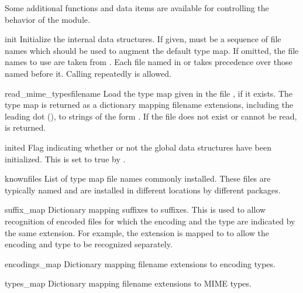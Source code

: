 Some additional functions and data items are available for controlling
the behavior of the module.


\begin{funcdesc}{init}{}
Initialize the internal data structures.  If given,  must
be a sequence of file names which should be used to augment the
default type map.  If omitted, the file names to use are taken from
.  Each file named in  or
 takes precedence over those named before it.
Calling  repeatedly is allowed.
\end{funcdesc}

\begin{funcdesc}{read_mime_types}{filename}
Load the type map given in the file , if it exists.  The 
type map is returned as a dictionary mapping filename extensions,
including the leading dot (), to strings of the form
.  If the file  does
not exist or cannot be read,  is returned.
\end{funcdesc}


\begin{datadesc}{inited}
Flag indicating whether or not the global data structures have been
initialized.  This is set to true by .
\end{datadesc}

\begin{datadesc}{knownfiles}
List of type map file names commonly installed.  These files are
typically named  and are installed in different
locations by different packages.
\end{datadesc}

\begin{datadesc}{suffix_map}
Dictionary mapping suffixes to suffixes.  This is used to allow
recognition of encoded files for which the encoding and the type are
indicated by the same extension.  For example, the 
extension is mapped to  to allow the encoding and type
to be recognized separately.
\end{datadesc}

\begin{datadesc}{encodings_map}
Dictionary mapping filename extensions to encoding types.
\end{datadesc}

\begin{datadesc}{types_map}
Dictionary mapping filename extensions to MIME types.
\end{datadesc}


